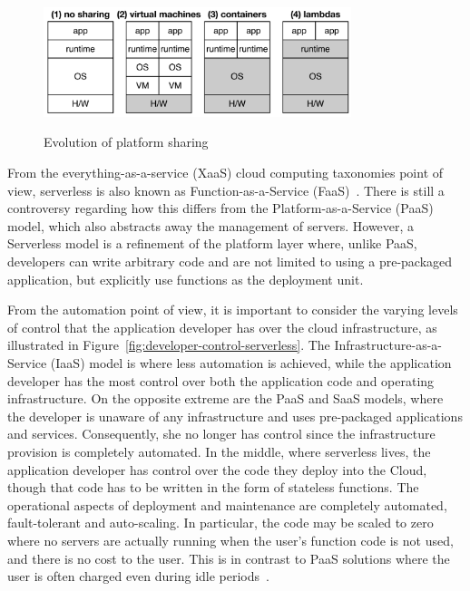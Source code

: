 \begin{figure}
  \centering
    \includegraphics[width=0.8\textwidth]{figs/evolution-platform-sharing.png}
    \label{fig:Evolution-of-Sharing}
    \caption{Evolution of platform sharing~\cite{hendrickson2016serverless}}
\end{figure}


From the everything-as-a-service (XaaS) cloud computing taxonomies point of view, serverless is also known as Function-as-a-Service (FaaS)~\cite{2 MateosFaas}. There is still a controversy regarding how this differs from the Platform-as-a-Service (PaaS) model, which also abstracts away the management of servers. However, a Serverless model is a refinement of the platform layer where, unlike PaaS, developers can write arbitrary code and are not limited to using a pre-packaged application, but explicitly use functions as the deployment unit. 


From the automation point of view, it is important to consider the varying levels of control that the application developer has over the cloud infrastructure, as illustrated in Figure~\ref{fig:developer-control-serverless}. The Infrastructure-as-a-Service (IaaS) model is where less automation is achieved, while the application developer has the most control over both the application code and operating infrastructure. On the opposite extreme are the PaaS and SaaS models, where the developer is unaware of any infrastructure and uses pre-packaged applications and services. Consequently, she no longer has control since the infrastructure provision is completely automated. In the middle, where serverless lives, the application developer has control over the code they deploy into the Cloud, though that code has to be written in the form of stateless functions.  The operational aspects of deployment and maintenance are completely automated, fault-tolerant and
auto-scaling. In particular, the code may be scaled to zero where no servers are actually running when the user's function code is not used, and there is no cost to the user. This is in contrast to PaaS solutions where the user is often charged even during idle periods~\cite{baldini2017serverless}.

